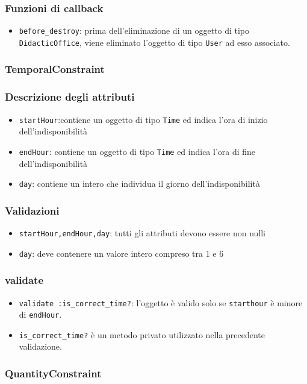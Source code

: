 \documentclass[11pt,a4paper]{article}
\begin{document}
\subsubsection*{Funzioni di callback}
\begin{itemize}
 \item \verb|before_destroy|: prima dell'eliminazione di un oggetto di tipo \\ \verb|DidacticOffice|, viene eliminato l'oggetto di tipo \verb|User| ad esso associato.
\end{itemize}
\subsubsection{TemporalConstraint}
\subsubsection*{Descrizione degli attributi}
\begin{itemize}
 \item \verb|startHour|:contiene un oggetto di tipo \verb|Time| ed indica l'ora di inizio dell'indisponibilità
 \item \verb|endHour|: contiene un oggetto di tipo \verb|Time| ed indica l'ora di fine dell'indisponibilità
 \item \verb|day|: contiene un intero che individua il giorno dell'indisponibilità
\end{itemize}
\subsubsection*{Validazioni}
\begin{itemize}
 \item \verb|startHour,endHour,day|: tutti gli attributi devono essere non nulli
 \item \verb|day|: deve contenere un valore intero compreso tra 1 e 6
 \end{itemize}
\subsubsection*{validate}
\begin{itemize}
 \item \verb|validate :is_correct_time?|: l'oggetto è valido solo se \verb|starthour| è minore di \verb|endHour|. \item \verb|is_correct_time?| è un metodo privato utilizzato nella precedente validazione.
\end{itemize}
\subsubsection{QuantityConstraint}
\end{document}
